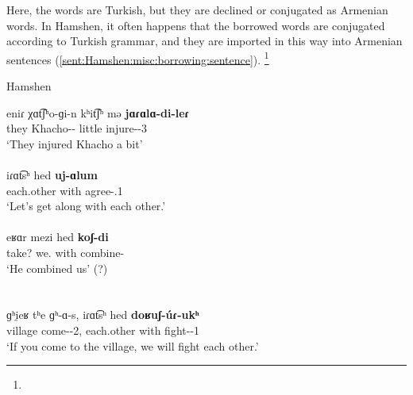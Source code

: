 Here, the words are Turkish, but they are declined or conjugated as Armenian words. In Hamshen, it often happens that the borrowed words are conjugated according to Turkish grammar, and they are imported in this way into Armenian sentences (\ref{sent:Hamshen:misc:borrowing:sentence}). \footnote{}

\begin{exe}
	\ex Hamshen \label{sent:Hamshen:misc:borrowing:sentence}
	
	
	\begin{xlist}
		\ex \gll eniɾ χɑt͡ʃʰo-ɡi-n kʰit͡ʃʰ mə \textbf{jɑɾɑlɑ-di-leɾ} \\
		they Khacho-{\dat}-{} little {\indf} injure-{\pst}-3{\pl} \\
		\trans `They injured Khacho a bit'\\
		 \\
		\ex \gll iɾɑt͡sʰ hed \textbf{uj-ɑlum} \\
		each.other with agree-{\opt}.1{\pl} \\
		\trans `Let's get along with each other.' \\
		 \\
		\ex \gll eʁɑr mezi hed \textbf{koʃ-di} \\
		take? we.{\dat} with combine-{\pst} \\
		\trans `He combined us' (?) \label{sent:Hamshen:misc:borrowing:sentence:kosdi} \\  \\
		 \\
		\ex \gll ɡʰi̯eʁ tʰe ɡʰ-ɑ-s, iɾɑt͡sʰ hed \textbf{doʁuʃ-\'uɾ-ukʰ} \\
		village {\q} come-{\thgloss}-2{\sg}, each.other with fight-{\aor}-1{\pl} \\
		\trans `If you come to the village, we will fight each other.'\\

\end{xlist}
\end{exe}
